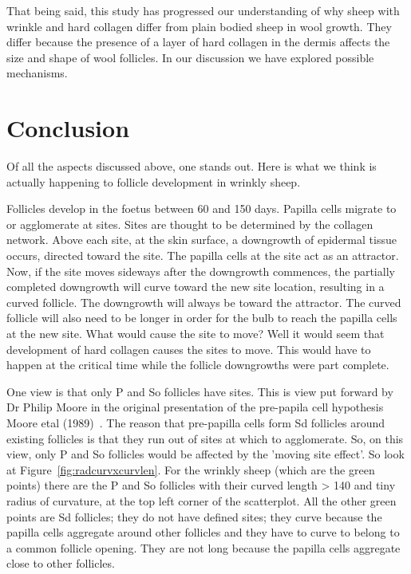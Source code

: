 \documentclass[titlepage]{article}  %
\begin{document}
That being said, this study has progressed our understanding of why sheep with wrinkle and hard collagen differ from plain bodied sheep in wool growth. They differ because the presence of a layer of hard collagen in the dermis affects the size and shape of wool follicles. In our discussion we have explored possible mechanisms.

\section{Conclusion}
Of all the aspects discussed above, one stands out. Here is what we think is actually happening to follicle development in wrinkly sheep.

Follicles develop in the foetus between 60 and 150 days. Papilla cells migrate to  or agglomerate at sites. Sites are thought to be determined by the collagen network. Above each site, at the skin surface, a downgrowth of epidermal tissue occurs, directed toward the site. The papilla cells at the site act as an attractor.  Now, if the site moves sideways after the downgrowth commences, the partially completed downgrowth will curve toward the new site location, resulting in a curved follicle. The downgrowth will always be toward the attractor. The curved follicle will also need to be longer in order for the bulb to reach the papilla cells at the new site. What would cause the site to move? Well  it would seem that development of hard collagen causes the sites to move. This would have to happen at the critical time while the follicle downgrowths were part complete.

One view is that only P and So follicles have sites. This is view put forward by Dr Philip Moore in the original presentation of the pre-papila cell hypothesis Moore etal (1989)~\cite{moor:89}. The reason that pre-papilla cells form Sd follicles around existing follicles is that they run out of sites at which to agglomerate. So, on this view,  only P and So follicles would be affected by the 'moving site effect'. So look at Figure~\ref{fig:radcurvxcurvlen}. For the wrinkly sheep  (which are the green points) there are the P and So follicles with their curved length > 140 and tiny radius of curvature, at the top left corner of the scatterplot. All the other green points are Sd follicles; they do not have defined sites; they curve because the papilla cells aggregate around other follicles and they have to curve to belong to a common follicle opening. They are not long because the papilla cells aggregate close to other follicles.
\end{document}
